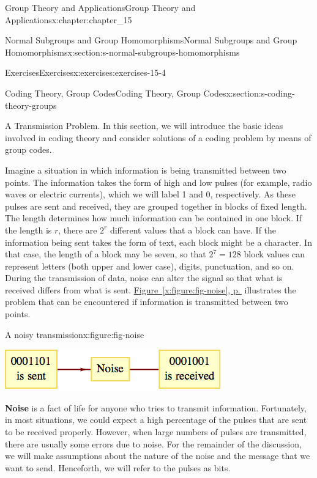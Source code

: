 \documentclass[twoside,10pt,]{book}
\newcommand{\xreffont}{\relax}
\newcommand{\terminology}[1]{\textbf{#1}}
\numberwithin{equation}{section}
\begin{document}
\begin{chapterptx}{Group Theory and Applications}{}{Group Theory and Applications}{}{}{x:chapter:chapter_15}
\begin{sectionptx}{Normal Subgroups and Group Homomorphisms}{}{Normal Subgroups and Group Homomorphisms}{}{}{x:section:s-normal-subgroups-homomorphisms}
\begin{exercises-subsection}{Exercises}{}{Exercises}{}{}{x:exercises:exercises-15-4}
\end{exercises-subsection}
\end{sectionptx}
%
%
\typeout{************************************************}
\typeout{************************************************}
%
\begin{sectionptx}{Coding Theory, Group Codes}{}{Coding Theory, Group Codes}{}{}{x:section:s-coding-theory-groups}
%
%
\begin{introduction}{A Transmission Problem.}%
In this section, we will introduce the basic ideas involved in coding theory and consider solutions of a coding problem by means of group codes.%
\par
Imagine a situation in which information is being transmitted between two points. The information takes the form of high and low pulses (for example, radio waves or electric currents), which we will label 1 and 0, respectively.  As these pulses are sent and received, they are grouped together in blocks of fixed length.   The length determines how much information can be contained in one block.  If the length is \(r\), there are \(2^r\) different values that a block can have. If the information being sent takes the form of text, each block might be a character. In that case, the length of a block may be seven, so that \(2^7 = 128\) block values can represent letters (both upper and lower case), digits, punctuation, and so on.  During the transmission of data, noise can alter the signal so that what is received differs from what is sent. \hyperref[x:figure:fig-noise]{Figure~{\xreffont\ref{x:figure:fig-noise}}, p.\,\pageref{x:figure:fig-noise}} illustrates the problem that can be encountered if information is transmitted between two points.%
\begin{figureptx}{A noisy transmission}{x:figure:fig-noise}{}%
\begin{image}{0.2}{0.6}{0.2}%
\includegraphics[width=\linewidth]{images/fig-noise.png}
\end{image}%
\tcblower
\end{figureptx}%
\terminology{Noise} is a fact of life for anyone who tries to transmit information.  Fortunately, in most situations, we could expect a high percentage of the pulses that are sent to be received properly. However, when large numbers of pulses are transmitted, there are usually some errors due to noise. For the remainder of the discussion, we will make assumptions about the nature of the noise and the message that we want to send. Henceforth, we will refer to the pulses as bits.%

\end{introduction}
\end{sectionptx}
\end{chapterptx}
\end{document}
